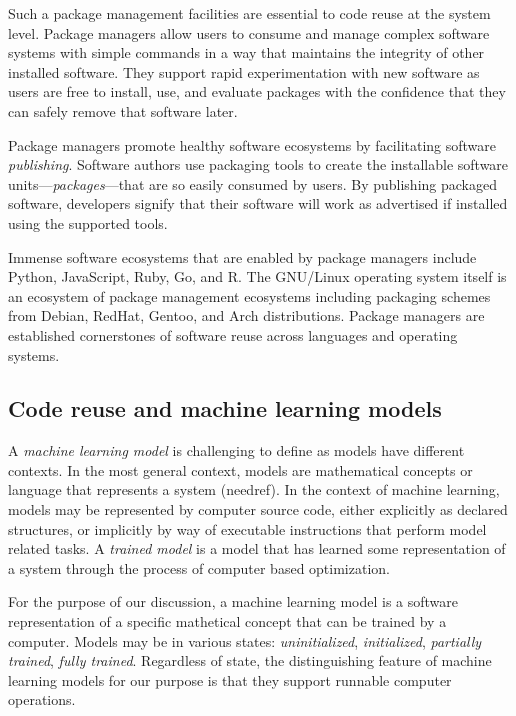 \documentclass{article}
\begin{document}
Such a package management facilities are essential to code reuse at
the system level. Package managers allow users to consume and manage
complex software systems with simple commands in a way that maintains
the integrity of other installed software. They support rapid
experimentation with new software as users are free to install, use,
and evaluate packages with the confidence that they can safely remove
that software later.

Package managers promote healthy software ecosystems by facilitating
software \emph{publishing}. Software authors use packaging tools to
create the installable software units---\emph{packages}---that are so
easily consumed by users. By publishing packaged software, developers
signify that their software will work as advertised if installed using
the supported tools.

Immense software ecosystems that are enabled by package managers
include Python, JavaScript, Ruby, Go, and R. The GNU/Linux operating
system itself is an ecosystem of package management ecosystems
including packaging schemes from Debian, RedHat, Gentoo, and Arch
distributions. Package managers are established cornerstones of
software reuse across languages and operating systems.

\subsection{Code reuse and machine learning models}

A \emph{machine learning model} is challenging to define as models
have different contexts. In the most general context, models are
mathematical concepts or language that represents a system
(needref). In the context of machine learning, models may be
represented by computer source code, either explicitly as declared
structures, or implicitly by way of executable instructions that
perform model related tasks. A \emph{trained model} is a model that
has learned some representation of a system through the process of
computer based optimization.

For the purpose of our discussion, a machine learning model is a
software representation of a specific mathetical concept that can be
trained by a computer. Models may be in various states:
\emph{uninitialized}, \emph{initialized}, \emph{partially trained},
\emph{fully trained}. Regardless of state, the distinguishing feature
of machine learning models for our purpose is that they support
runnable computer operations.
\end{document}
